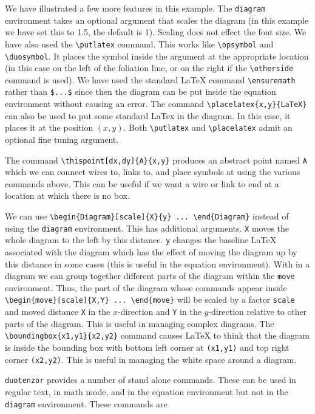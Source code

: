 \documentclass[10pt]{article}
\begin{document}
\noindent We have illustrated a few more features in this example.  The \verb+diagram+ environment takes an optional argument that scales the diagram (in this example we have set this to 1.5, the default is 1).  Scaling does not effect the font size.  We have also used the \verb+\putlatex+ command.  This works like \verb+\opsymbol+ and \verb+\duosymbol+. It places the symbol inside the argument at the appropriate location (in this case on the left of the foliation line, or on the right if the \verb+\otherside+ command is used).  We have used the standard LaTeX command \verb+\ensuremath+ rather than \verb+$...$+  since then the diagram can be put inside the equation environment without causing an error.  The command \verb+\placelatex{x,y}{LaTeX}+ can also be used to put some standard LaTex in the diagram.  In this case, it places it at the position $(x,y)$.  Both \verb+\putlatex+ and \verb+\placelatex+ admit an optional fine tuning argument.

The command \verb+\thispoint[dx,dy]{A}{x,y}+ produces an abstract point named \verb+A+ which we can connect wires to, links to, and place symbols at using the various commands above.  This can be useful if we want a wire or link to end at a location at which there is no box.

We can use \verb+\begin{Diagram}[scale]{X}{y} ... \end{Diagram}+ instead of using the \verb+diagram+ environment.  This has additional arguments.  \verb+X+ moves the whole diagram to the left by this distance.  \verb+y+ changes the baseline LaTeX associated with the diagram which has the effect of moving the diagram up by this distance in some cases (this is useful in the equation environment).   With in a diagram we can group together different parts of the diagram within the \verb+move+ environment.  Thus, the part of the diagram whose commands appear inside \verb+\begin{move}[scale]{X,Y} ... \end{move}+ will be scaled by a factor \verb+scale+ and moved distance \verb+X+ in the $x$-direction and \verb+Y+ in the $y$-direction relative to other parts of the diagram.   This is useful in managing complex diagrams.
The \verb+\boundingbox{x1,y1}{x2,y2}+ command causes LaTeX to think that the diagram is inside the bounding box with bottom left corner at \verb+(x1,y1)+ and top right corner \verb+(x2,y2)+.  This is useful in managing the white space around a diagram.

\verb+duotenzor+ provides a number of stand alone commands.  These can be used in regular text, in math mode, and in the equation environment but not in the \verb+diagram+ environment.  These commands are
\end{document}
